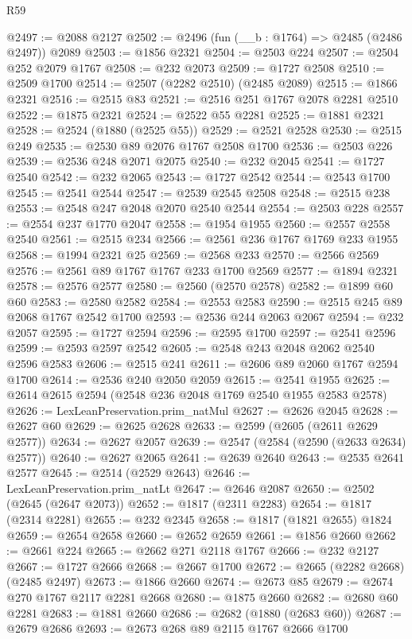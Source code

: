 \begin{lexlean}{R59}
\begin{coremodule}
@2497 := @2088 @2127
@2502 := @2496 (fun (__b : @1764) => @2485 (@2486 @2497)) @2089
@2503 := @1856 @2321
@2504 := @2503 @224
@2507 := @2504 @252 @2079 @1767
@2508 := @232 @2073
@2509 := @1727 @2508
@2510 := @2509 @1700
@2514 := @2507 (@2282 @2510) (@2485 @2089)
@2515 := @1866 @2321
@2516 := @2515 @83
@2521 := @2516 @251 @1767 @2078 @2281 @2510
@2522 := @1875 @2321
@2524 := @2522 @55 @2281
@2525 := @1881 @2321
@2528 := @2524 (@1880 (@2525 @55))
@2529 := @2521 @2528
@2530 := @2515 @249
@2535 := @2530 @89 @2076 @1767 @2508 @1700
@2536 := @2503 @226
@2539 := @2536 @248 @2071 @2075
@2540 := @232 @2045
@2541 := @1727 @2540
@2542 := @232 @2065
@2543 := @1727 @2542
@2544 := @2543 @1700
@2545 := @2541 @2544
@2547 := @2539 @2545 @2508
@2548 := @2515 @238
@2553 := @2548 @247 @2048 @2070 @2540 @2544
@2554 := @2503 @228
@2557 := @2554 @237 @1770 @2047
@2558 := @1954 @1955
@2560 := @2557 @2558 @2540
@2561 := @2515 @234
@2566 := @2561 @236 @1767 @1769 @233 @1955
@2568 := @1994 @2321 @25
@2569 := @2568 @233
@2570 := @2566 @2569
@2576 := @2561 @89 @1767 @1767 @233 @1700 @2569
@2577 := @1894 @2321
@2578 := @2576 @2577
@2580 := @2560 (@2570 @2578)
@2582 := @1899 @60 @60
@2583 := @2580 @2582
@2584 := @2553 @2583
@2590 := @2515 @245 @89 @2068 @1767 @2542 @1700
@2593 := @2536 @244 @2063 @2067
@2594 := @232 @2057
@2595 := @1727 @2594
@2596 := @2595 @1700
@2597 := @2541 @2596
@2599 := @2593 @2597 @2542
@2605 := @2548 @243 @2048 @2062 @2540 @2596 @2583
@2606 := @2515 @241
@2611 := @2606 @89 @2060 @1767 @2594 @1700
@2614 := @2536 @240 @2050 @2059
@2615 := @2541 @1955
@2625 := @2614 @2615 @2594 (@2548 @236 @2048 @1769 @2540 @1955 @2583 @2578)
@2626 := LexLeanPreservation.prim_natMul
@2627 := @2626 @2045
@2628 := @2627 @60
@2629 := @2625 @2628
@2633 := @2599 (@2605 (@2611 @2629 @2577))
@2634 := @2627 @2057
@2639 := @2547 (@2584 (@2590 (@2633 @2634) @2577))
@2640 := @2627 @2065
@2641 := @2639 @2640
@2643 := @2535 @2641 @2577
@2645 := @2514 (@2529 @2643)
@2646 := LexLeanPreservation.prim_natLt
@2647 := @2646 @2087
@2650 := @2502 (@2645 (@2647 @2073))
@2652 := @1817 (@2311 @2283)
@2654 := @1817 (@2314 @2281)
@2655 := @232 @2345
@2658 := @1817 (@1821 @2655) @1824
@2659 := @2654 @2658
@2660 := @2652 @2659
@2661 := @1856 @2660
@2662 := @2661 @224
@2665 := @2662 @271 @2118 @1767
@2666 := @232 @2127
@2667 := @1727 @2666
@2668 := @2667 @1700
@2672 := @2665 (@2282 @2668) (@2485 @2497)
@2673 := @1866 @2660
@2674 := @2673 @85
@2679 := @2674 @270 @1767 @2117 @2281 @2668
@2680 := @1875 @2660
@2682 := @2680 @60 @2281
@2683 := @1881 @2660
@2686 := @2682 (@1880 (@2683 @60))
@2687 := @2679 @2686
@2693 := @2673 @268 @89 @2115 @1767 @2666 @1700

\end{coremodule}
\end{lexlean}
